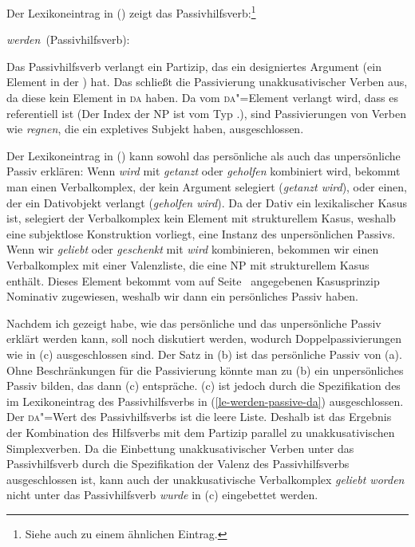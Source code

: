 Der Lexikoneintrag in () zeigt das Passivhilfsverb:\footnote{
  Siehe auch  zu einem ähnlichen Eintrag.%
}

\eas
\label{le-werden-passive-da}
\mbox{\emph{werden} (Passivhilfsverb):}\\
\zs

\noindent
Das Passivhilfsverb verlangt ein Partizip, das ein designiertes Argument (ein Element in der \dalist) hat.
Das schließt die Passivierung unakkusativischer Verben aus, da diese kein Element in \textsc{da} haben.
Da vom \textsc{da}"=Element verlangt wird, dass es referentiell ist (Der Index der NP ist vom Typ
.), sind Passivierungen von Verben wie \emph{regnen}, die ein expletives Subjekt haben, ausgeschlossen.

Der Lexikoneintrag in () kann sowohl das persönliche als auch das unpersönliche Passiv
erklären: Wenn \emph{wird} mit \emph{getanzt} oder \emph{geholfen} kombiniert wird,
bekommt man einen Verbalkomplex, der kein Argument selegiert (\emph{getanzt wird}), 
oder einen, der ein Dativobjekt verlangt (\emph{geholfen wird}). Da der Dativ ein lexikalischer
Kasus ist, selegiert der Verbalkomplex kein Element mit strukturellem Kasus, weshalb eine
subjektlose Konstruktion vorliegt, \dash eine Instanz des unpersönlichen Passivs.
Wenn wir \emph{geliebt} oder \emph{geschenkt} mit \emph{wird} kombinieren, bekommen
wir einen Verbalkomplex mit einer Valenzliste, die eine NP mit strukturellem Kasus enthält.
Dieses Element bekommt vom auf Seite~\pageref{case-p} angegebenen Kasusprinzip
Nominativ zugewiesen, weshalb wir dann ein persönliches Passiv haben.

Nachdem ich gezeigt habe, wie das persönliche und das unpersönliche Passiv erklärt werden
kann, soll noch diskutiert werden, wodurch Doppelpassivierungen wie in (c) ausgeschlossen sind.
\eal
\label{ex-double-application-of-passive}
\zl
Der Satz in (b) ist das persönliche Passiv von (a). Ohne Beschränkungen
für die Passivierung könnte man zu (b) ein unpersönliches Passiv bilden, das dann (c)
entspräche. (c) ist jedoch durch die Spezifikation des \dawes im Lexikoneintrag
des Passivhilfsverbs in (\ref{le-werden-passive-da}) ausgeschlossen. Der \textsc{da}"=Wert des Passivhilfsverbs
ist die leere Liste. Deshalb ist das Ergebnis der Kombination des Hilfsverbs mit dem Partizip parallel
zu unakkusativischen Simplexverben. Da die Einbettung unakkusativischer Verben unter das
Passivhilfsverb durch die Spezifikation der Valenz des Passivhilfsverbs ausgeschlossen ist,
kann auch der unakkusativische Verbalkomplex \emph{geliebt worden} nicht unter 
das Passivhilfsverb \emph{wurde} in (c) eingebettet werden.


